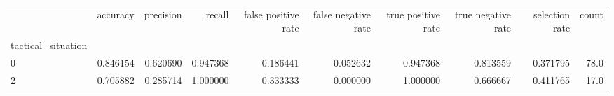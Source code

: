 \begin{tabular}{lrrrrrrrrr}
\toprule
{} &  accuracy &  precision &    recall &  false positive rate &  false negative rate &  true positive rate &  true negative rate &  selection rate &  count \\
tactical\_situation &           &            &           &                      &                      &                     &                     &                 &        \\
\midrule
0                  &  0.846154 &   0.620690 &  0.947368 &             0.186441 &             0.052632 &            0.947368 &            0.813559 &        0.371795 &   78.0 \\
2                  &  0.705882 &   0.285714 &  1.000000 &             0.333333 &             0.000000 &            1.000000 &            0.666667 &        0.411765 &   17.0 \\
\bottomrule
\end{tabular}
